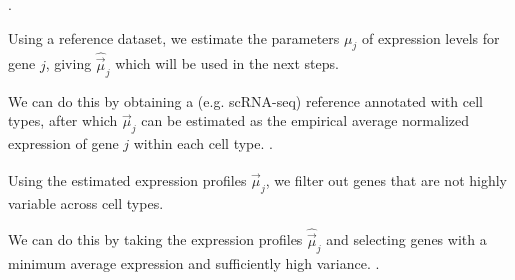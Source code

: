 \begin{enumerate}
    \ii 
    .
    
    Using a reference dataset, we estimate the parameters $\mu_j$ of expression levels for gene $j$, giving $\hat{\vec{\mu}}_j$ which will be used in the next steps.

    We can do this by obtaining a (e.g. scRNA-seq) reference annotated with cell types, after which $\vec{\mu}_j$ can be estimated as the empirical average normalized expression of gene $j$ within each cell type.
    \ii
    .

    Using the estimated expression profiles $\hat{\vec{\mu}}_j$, we filter out genes that are not highly variable across cell types.

    We can do this by taking the expression profiles $\hat{\vec{\mu}}_j$ and selecting genes with a minimum average expression and sufficiently high variance.
    \ii
    .


\end{enumerate}
